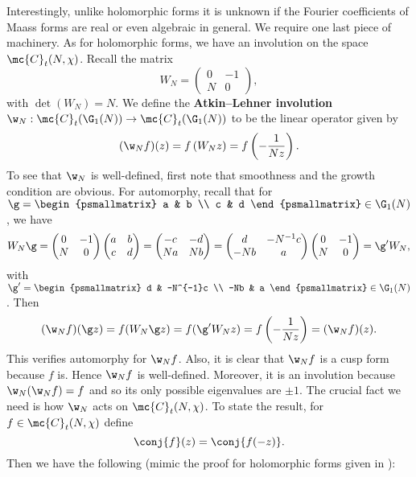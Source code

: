     Interestingly, unlike holomorphic forms it is unknown if the Fourier coefficients of Maass forms are real or even algebraic in general. We require one last piece of machinery. As for holomorphic forms, we have an involution on the space $\mc{C}_{t}(N,\chi)$. Recall the matrix
    \[
      W_{N} = \begin{pmatrix} 0 & -1 \\ N & 0 \end{pmatrix},
    \]
    with $\det(W_{N}) = N$. We define the \textbf{Atkin–Lehner involution} $\w_{N}:\mc{C}_{t}(\G_{1}(N)) \to \mc{C}_{t}(\G_{1}(N))$ to be the linear operator given by
    \[
      (\w_{N}f)(z) = f\left(W_{N}z\right) = f\left(-\frac{1}{Nz}\right).
    \]
    To see that $\w_{N}$ is well-defined, first note that smoothness and the growth condition are obvious. For automorphy, recall that for $\g = \begin{psmallmatrix} a & b \\ c & d \end{psmallmatrix} \in \G_{1}(N)$, we have
    \[
      W_{N}\g = \begin{pmatrix} 0 & -1 \\ N & 0 \end{pmatrix}\begin{pmatrix} a & b \\ c & d \end{pmatrix} = \begin{pmatrix} -c & -d \\ Na & Nb \\ \end{pmatrix} = \begin{pmatrix} d & -N^{-1}c \\ -Nb & a \end{pmatrix}\begin{pmatrix} 0 & -1 \\ N & 0 \end{pmatrix} = \g'W_{N},
    \]
    with $\g' = \begin{psmallmatrix} d & -N^{-1}c \\ -Nb & a \end{psmallmatrix} \in \G_{1}(N)$. Then
    \[
      (\w_{N}f)(\g z) = f(W_{N}\g z) = f(\g'W_{N}z) = f\left(-\frac{1}{Nz}\right) = (\w_{N}f)(z).
    \]
    This verifies automorphy for $\w_{N}f$. Also, it is clear that $\w_{N}f$ is a cusp form because $f$ is. Hence $\w_{N}f$ is well-defined. Moreover, it is an involution because $\w_{N}(\w_{N}f) = f$ and so its only possible eigenvalues are $\pm 1$. The crucial fact we need is how $\w_{N}$ acts on $\mc{C}_{t}(N,\chi)$. To state the result, for $f \in \mc{C}_{t}(N,\chi)$ define
    \[
      \conj{f}(z) = \conj{f(-z)}.
    \]
    Then we have the following (mimic the proof for holomorphic forms given in \cite{cohenmodular2017}):

